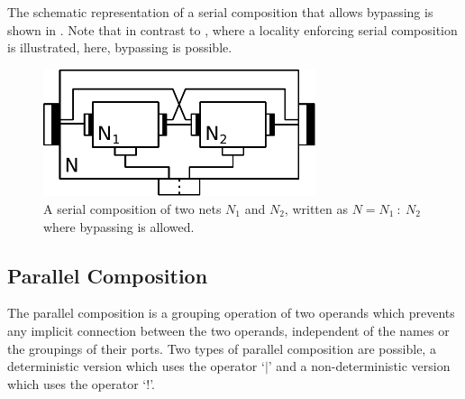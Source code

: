 The schematic representation of a serial composition that allows bypassing is shown in \Fig{\ref{fig_smx_sb}}.
Note that in contrast to \Fig{\ref{fig_smx_sl}}, where a locality enforcing serial composition is illustrated, here, bypassing is possible.
\begin{figure}[bht]\begin{center}
\TopFigSpace
    \includegraphics[width=8cm]{fig/serial_b.pdf}
    \CaptionFigSpace
    \caption{A serial composition of two nets $N_1$ and $N_2$, written as $N = N_1\ :\ N_2$ where bypassing is allowed.}
    \label{fig_smx_sb}
\end{center}\end{figure}


\subsection{Parallel Composition}
\label{sect_smx_network_parallel}
The parallel composition is a grouping operation of two operands which prevents any implicit connection between the two operands, independent of the names or the groupings of their ports.
Two types of parallel composition are possible, a deterministic version which uses the operator `$|$' and a non-deterministic version which uses the operator `$!$'.

